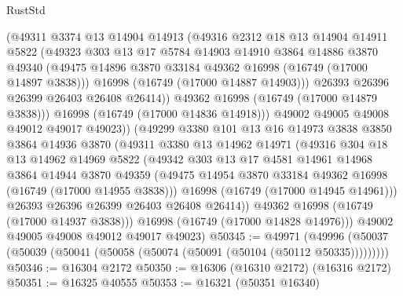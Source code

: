 \begin{lexlean}{RustStd}
\begin{coremodule}
                (@49311
                  @3374
                  @13
                  @14904
                  @14913
                  (@49316
                    @2312
                    @18
                    @13
                    @14904
                    @14911
                    @5822
                    (@49323
                      @303
                      @13
                      @17
                      @5784
                      @14903
                      @14910
                      @3864
                      @14886
                      @3870
                      @49340
                      (@49475 @14896 @3870 @33184 @49362 @16998 (@16749 (@17000 @14897 @3838)))
                      @16998
                      (@16749 (@17000 @14887 @14903)))
                    @26393
                    @26396
                    @26399
                    @26403
                    @26408
                    @26414))
                @49362
                @16998
                (@16749 (@17000 @14879 @3838)))
              @16998
              (@16749 (@17000 @14836 @14918)))
            @49002
            @49005
            @49008
            @49012
            @49017
            @49023))
        (@49299
          @3380
          @101
          @13
          @16
          @14973
          @3838
          @3850
          @3864
          @14936
          @3870
          (@49311
            @3380
            @13
            @14962
            @14971
            (@49316
              @304
              @18
              @13
              @14962
              @14969
              @5822
              (@49342
                @303
                @13
                @17
                @4581
                @14961
                @14968
                @3864
                @14944
                @3870
                @49359
                (@49475 @14954 @3870 @33184 @49362 @16998 (@16749 (@17000 @14955 @3838)))
                @16998
                (@16749 (@17000 @14945 @14961)))
              @26393
              @26396
              @26399
              @26403
              @26408
              @26414))
          @49362
          @16998
          (@16749 (@17000 @14937 @3838)))
        @16998
        (@16749 (@17000 @14828 @14976)))
      @49002
      @49005
      @49008
      @49012
      @49017
      @49023)
@50345 := @49971
    (@49996 (@50037 (@50039 (@50041 (@50058 (@50074 (@50091 (@50104 (@50112 @50335)))))))))
@50346 := @16304 @2172
@50350 := @16306 (@16310 @2172) (@16316 @2172)
@50351 := @16325 @40555
@50353 := @16321 (@50351 @16340)

\end{coremodule}
\end{lexlean}
